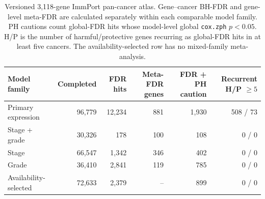 \begin{table}[p]
\centering
\caption{Versioned 3,118-gene ImmPort pan-cancer atlas. Gene--cancer BH-FDR and gene-level meta-FDR are calculated separately within each comparable model family. PH cautions count global-FDR hits whose model-level global \texttt{cox.zph} $p<0.05$. H/P is the number of harmful/protective genes recurring as global-FDR hits in at least five cancers. The availability-selected row has no mixed-family meta-analysis.}
\label{tab:immune-atlas-model-summary}
\scriptsize
\setlength{\tabcolsep}{3pt}
\begin{tabular}{lrrrrr}
\toprule
Model family & Completed & FDR hits & Meta-FDR genes & FDR + PH caution & Recurrent H/P $\geq 5$ \\
\midrule
Primary expression & 96,779 & 12,234 & 881 & 1,930 & 508 / 73 \\
Stage + grade & 30,326 & 178 & 100 & 108 & 0 / 0 \\
Stage & 66,547 & 1,342 & 346 & 402 & 0 / 0 \\
Grade & 36,410 & 2,841 & 119 & 785 & 0 / 0 \\
Availability-selected & 72,633 & 2,379 & -- & 899 & 0 / 0 \\
\bottomrule
\end{tabular}
\end{table}
